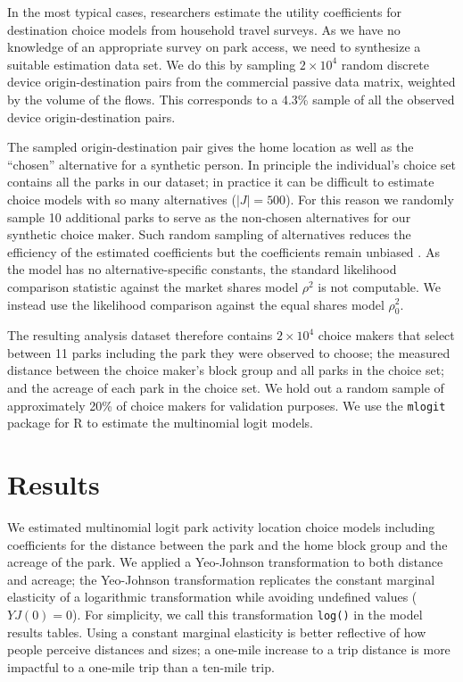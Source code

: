 \documentclass[3p, authoryear]{elsarticle} %
\begin{document}
In the most typical cases, researchers estimate the utility coefficients for
destination choice models from household travel surveys. As we have no knowledge
of an appropriate survey on park access, we need to synthesize a suitable
estimation data set. We do this by sampling
\ensuremath{2\times 10^{4}} random discrete device origin-destination pairs from the commercial
passive data matrix, weighted by the volume of the flows. This corresponds to a
4.3\% sample of all the observed device
origin-destination pairs.

The sampled origin-destination pair gives the home location as well as the
``chosen'' alternative for a synthetic person. In principle the individual's
choice set contains all the parks in our dataset; in practice it can be
difficult to estimate choice models with so many alternatives
(\(|J| = 500\)). For this reason we randomly sample 10 additional parks
to serve as the non-chosen alternatives for our synthetic choice maker. Such
random sampling of alternatives reduces the efficiency of the estimated
coefficients but the coefficients remain unbiased \citep{train2009}. As the model has
no alternative-specific constants, the standard likelihood comparison statistic
against the market shares model \(\rho^2\) is not computable. We instead use the
likelihood comparison against the equal shares model \(\rho_0^2\).

The resulting analysis dataset therefore contains \ensuremath{2\times 10^{4}} choice makers that
select between 11 parks including the park they were observed to
choose; the measured distance between the choice maker's block group and all
parks in the choice set; and the acreage of each park in the choice set. We hold
out a random sample of approximately 20\% of choice makers for validation
purposes. We use the \texttt{mlogit} package for R \citep{mlogit, R} to estimate the
multinomial logit models.

\hypertarget{results}{%
\section{Results}\label{results}}

We estimated multinomial logit park activity location choice models including
coefficients for the distance between the park and the home block group and the
acreage of the park. We applied a Yeo-Johnson transformation \citep{Yeo2000} to both
distance and acreage; the Yeo-Johnson transformation replicates the constant
marginal elasticity of a logarithmic transformation while avoiding undefined
values (\(YJ(0) = 0\)). For simplicity, we call this transformation \texttt{log()} in the
model results tables. Using a constant marginal elasticity is better reflective
of how people perceive distances and sizes; a one-mile increase to a trip
distance is more impactful to a one-mile trip than a ten-mile trip.
\end{document}
